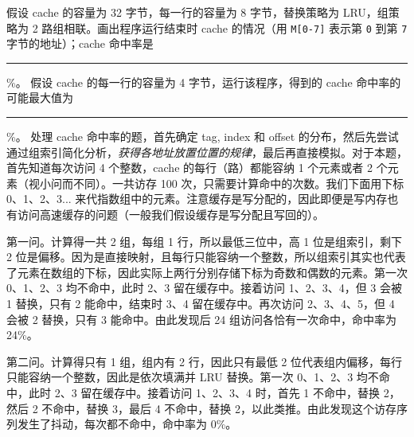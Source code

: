 \begin{problems}
        \qn 假设 cache 的容量为 32 字节，每一行的容量为 8 字节，替换策略为 LRU，组策略为 2 路组相联。画出程序运行结束时 cache 的情况（用 \verb|M[0-7]| 表示第 \verb|0| 到第 \verb|7| 字节的地址）；cache 命中率是 \rule{2.5cm}{0.25mm}\%。
        \qn 假设 cache 的每一行的容量为 4 字节，运行该程序，得到的 cache 命中率的可能最大值为 \rule{2.5cm}{0.25mm}\%。
        \sol 处理 cache 命中率的题，首先确定 tag, index 和 offset 的分布，然后先尝试通过组索引简化分析，\emph{获得各地址放置位置的规律}，最后再直接模拟。对于本题，首先知道每次访问 4 个整数，cache 的每行（路）都能容纳 1 个元素或者 2 个元素（视小问而不同）。一共访存 100 次，只需要计算命中的次数。我们下面用下标 0、1、2、3... 来代指数组中的元素。注意缓存是写分配的，因此即便是写内存也有访问高速缓存的问题（一般我们假设缓存是写分配且写回的）。

        第一问。计算得一共 2 组，每组 1 行，所以最低三位中，高 1 位是组索引，剩下 2 位是偏移。因为是直接映射，且每行只能容纳一个整数，所以组索引其实也代表了元素在数组的下标，因此实际上两行分别存储下标为奇数和偶数的元素。第一次 0、1、2、3 均不命中，此时 2、3 留在缓存中。接着访问 1、2、3、4，但 3 会被 1 替换，只有 2 能命中，结束时 3、4 留在缓存中。再次访问 2、3、4、5，但 4 会被 2 替换，只有 3 能命中。由此发现后 24 组访问各恰有一次命中，命中率为 24\%。

        第二问。计算得只有 1 组，组内有 2 行，因此只有最低 2 位代表组内偏移，每行只能容纳一个整数，因此是依次填满并 LRU 替换。第一次 0、1、2、3 均不命中，此时 2、3 留在缓存中。接着访问 1、2、3、4 时，首先 1 不命中，替换 2，然后 2 不命中，替换 3，最后 4 不命中，替换 2，以此类推。由此发现这个访存序列发生了抖动，每次都不命中，命中率为 0\%。


\end{problems}
